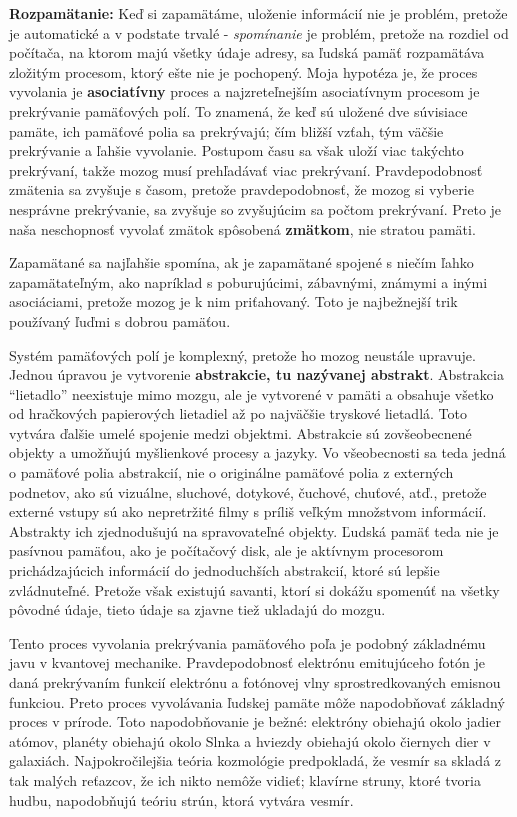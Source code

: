 \documentclass[11pt,a4paper]{book}
\begin{document}
\textbf{Rozpamätanie:} Keď si zapamätáme, uloženie informácií nie je problém, pretože je automatické a v podstate trvalé - \emph{spomínanie} je problém, pretože na rozdiel od počítača, na ktorom majú všetky údaje adresy, sa ľudská pamäť rozpamätáva zložitým procesom, ktorý ešte nie je pochopený. Moja hypotéza je, že proces vyvolania je \textbf{asociatívny} proces a najzreteľnejším asociatívnym procesom je prekrývanie pamäťových polí. To znamená, že keď sú uložené dve súvisiace pamäte, ich pamäťové polia sa prekrývajú; čím bližší vzťah, tým väčšie prekrývanie a ľahšie vyvolanie. Postupom času sa však uloží viac takýchto prekrývaní, takže mozog musí prehľadávať viac prekrývaní. Pravdepodobnosť zmätenia sa zvyšuje s časom, pretože pravdepodobnosť, že mozog si vyberie nesprávne prekrývanie, sa zvyšuje so zvyšujúcim sa počtom prekrývaní. Preto je naša neschopnosť vyvolať zmätok spôsobená \textbf{zmätkom}, nie stratou pamäti.

Zapamätané sa najľahšie spomína, ak je zapamätané spojené s niečím ľahko zapamätateľným, ako napríklad s poburujúcimi, zábavnými, známymi a inými asociáciami, pretože mozog je k nim priťahovaný. Toto je najbežnejší trik používaný ľuďmi s dobrou pamäťou.

Systém pamäťových polí je komplexný, pretože ho mozog neustále upravuje. Jednou úpravou je vytvorenie \textbf{abstrakcie, tu nazývanej abstrakt}. Abstrakcia “lietadlo” neexistuje mimo mozgu, ale je vytvorené v pamäti a obsahuje všetko od hračkových papierových lietadiel až po najväčšie tryskové lietadlá. Toto vytvára ďalšie umelé spojenie medzi objektmi. Abstrakcie sú zovšeobecnené objekty a umožňujú myšlienkové procesy a jazyky. Vo všeobecnosti sa teda jedná o pamäťové polia abstrakcií, nie o originálne pamäťové polia z externých podnetov, ako sú vizuálne, sluchové, dotykové, čuchové, chuťové, atď., pretože externé vstupy sú ako nepretržité filmy s príliš veľkým množstvom informácií. Abstrakty ich zjednodušujú na spravovateľné objekty. Ľudská pamäť teda nie je pasívnou pamäťou, ako je počítačový disk, ale je aktívnym procesorom prichádzajúcich informácií do jednoduchších abstrakcií, ktoré sú lepšie zvládnuteľné. Pretože však existujú savanti, ktorí si dokážu spomenúť na všetky pôvodné údaje, tieto údaje sa zjavne tiež ukladajú do mozgu.

Tento proces vyvolania prekrývania pamäťového poľa je podobný základnému javu v kvantovej mechanike. Pravdepodobnosť elektrónu emitujúceho fotón je daná prekrývaním funkcií elektrónu a fotónovej vlny sprostredkovaných emisnou funkciou. Preto proces vyvolávania ľudskej pamäte môže napodobňovať základný proces v prírode. Toto napodobňovanie je bežné: elektróny obiehajú okolo jadier atómov, planéty obiehajú okolo Slnka a hviezdy obiehajú okolo čiernych dier v galaxiách. Najpokročilejšia teória kozmológie predpokladá, že vesmír sa skladá z tak malých reťazcov, že ich nikto nemôže vidieť; klavírne struny, ktoré tvoria hudbu, napodobňujú teóriu strún, ktorá vytvára vesmír.
\end{document}
